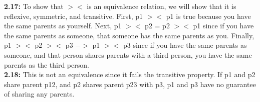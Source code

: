 



\noindent\textbf{2.17: } To show that $><$ is an equivalence relation, we will show that it is reflexive, symmetric, and transitive. First, p1 $><$ p1 is true because you have the same parents as yourself. Next, p1 $><$ p2 = p2 $><$ p1 since if you have the same parents as someone, that someone has the same parents as you. Finally, p1 $><$ p2 $><$ p3 $->$ p1 $><$ p3 since if you have the same parents as someone, and that person shares parents with a third person, you have the same parents as the third person. \\

\noindent\textbf{2.18: } This is not an equivalence since it fails the transitive property. If p1 and p2 share parent p12, and p2 shares parent p23 with p3, p1 and p3 have no guarantee of sharing any parents.



